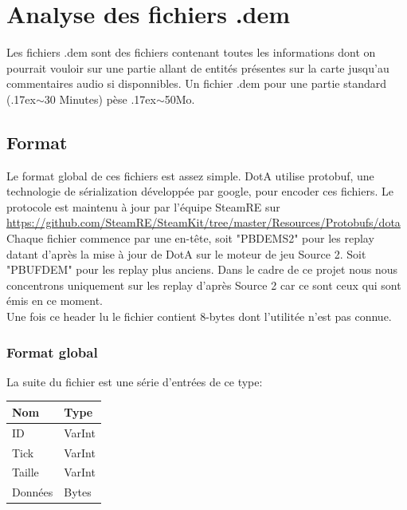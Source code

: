 \documentclass{article}
\begin{document}
\section{Analyse des fichiers .dem}

Les fichiers .dem sont des fichiers contenant toutes les informations dont on pourrait vouloir sur une partie allant de entités présentes sur la carte jusqu'au commentaires audio si disponnibles. Un fichier .dem pour une partie standard ({\raise.17ex\hbox{$\scriptstyle\mathtt{\sim}$}}30 Minutes) pèse {\raise.17ex\hbox{$\scriptstyle\mathtt{\sim}$}}50Mo.

\subsection{Format}

Le format global de ces fichiers est assez simple. DotA utilise protobuf, une technologie de sérialization développée par google, pour encoder ces fichiers. Le protocole est maintenu à jour par l'équipe SteamRE sur \url{https://github.com/SteamRE/SteamKit/tree/master/Resources/Protobufs/dota} \\
Chaque fichier commence par une en-tête, soit "PBDEMS2" pour les replay datant d'après la mise à jour de DotA sur le moteur de jeu Source 2. Soit "PBUFDEM" pour les replay plus anciens. Dans le cadre de ce projet nous nous concentrons uniquement sur les replay d'après Source 2 car ce sont ceux qui sont émis en ce moment.\\
Une fois ce header lu le fichier contient 8-bytes dont l'utilitée n'est pas connue.\\

\subsubsection{Format global}

La suite du fichier est une série d'entrées de ce type:\\
\begin{center}
	\begin{tabular}{| l | l |}
  	 \hline
  		 Nom & Type \\
  	 \hline
 	  	 ID & VarInt  \\
  		 Tick & VarInt  \\
  		 Taille & VarInt \\
  		 Données & Bytes \\
   	\hline
	\end{tabular}
\end{center}
\end{document}
